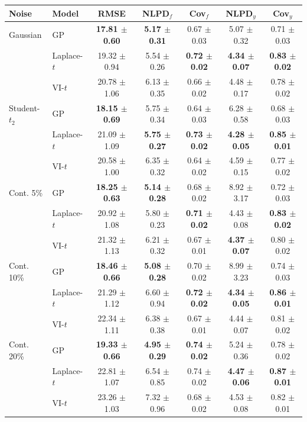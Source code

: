 \begin{tabular}{llccccc}
\toprule
Noise & Model & RMSE & NLPD$_f$ & Cov$_f$ & NLPD$_y$ & Cov$_y$ \\
\midrule
Gaussian & GP & \textbf{17.81 $\pm$ 0.60} & \textbf{5.17 $\pm$ 0.31} & 0.67 $\pm$ 0.03 & 5.07 $\pm$ 0.32 & 0.71 $\pm$ 0.03 \\
 & Laplace-$t$ & 19.32 $\pm$ 0.94 & 5.54 $\pm$ 0.26 & \textbf{0.72 $\pm$ 0.02} & \textbf{4.34 $\pm$ 0.07} & \textbf{0.83 $\pm$ 0.02} \\
 & VI-$t$ & 20.78 $\pm$ 1.06 & 6.13 $\pm$ 0.35 & 0.66 $\pm$ 0.02 & 4.48 $\pm$ 0.17 & 0.78 $\pm$ 0.02 \\
\midrule
Student-$t_2$ & GP & \textbf{18.15 $\pm$ 0.69} & 5.75 $\pm$ 0.34 & 0.64 $\pm$ 0.03 & 6.28 $\pm$ 0.58 & 0.68 $\pm$ 0.03 \\
 & Laplace-$t$ & 21.09 $\pm$ 1.09 & \textbf{5.75 $\pm$ 0.27} & \textbf{0.73 $\pm$ 0.02} & \textbf{4.28 $\pm$ 0.05} & \textbf{0.85 $\pm$ 0.01} \\
 & VI-$t$ & 20.58 $\pm$ 1.00 & 6.35 $\pm$ 0.32 & 0.64 $\pm$ 0.02 & 4.59 $\pm$ 0.15 & 0.77 $\pm$ 0.02 \\
\midrule
Cont. 5\% & GP & \textbf{18.25 $\pm$ 0.63} & \textbf{5.14 $\pm$ 0.28} & 0.68 $\pm$ 0.02 & 8.92 $\pm$ 3.17 & 0.72 $\pm$ 0.03 \\
 & Laplace-$t$ & 20.92 $\pm$ 1.08 & 5.80 $\pm$ 0.23 & \textbf{0.71 $\pm$ 0.02} & 4.43 $\pm$ 0.08 & \textbf{0.83 $\pm$ 0.02} \\
 & VI-$t$ & 21.32 $\pm$ 1.13 & 6.21 $\pm$ 0.32 & 0.67 $\pm$ 0.01 & \textbf{4.37 $\pm$ 0.07} & 0.80 $\pm$ 0.02 \\
\midrule
Cont. 10\% & GP & \textbf{18.46 $\pm$ 0.66} & \textbf{5.08 $\pm$ 0.28} & 0.70 $\pm$ 0.02 & 8.99 $\pm$ 3.23 & 0.74 $\pm$ 0.03 \\
 & Laplace-$t$ & 21.29 $\pm$ 1.12 & 6.60 $\pm$ 0.94 & \textbf{0.72 $\pm$ 0.02} & \textbf{4.34 $\pm$ 0.05} & \textbf{0.86 $\pm$ 0.01} \\
 & VI-$t$ & 22.34 $\pm$ 1.11 & 6.38 $\pm$ 0.38 & 0.67 $\pm$ 0.01 & 4.44 $\pm$ 0.07 & 0.81 $\pm$ 0.02 \\
\midrule
Cont. 20\% & GP & \textbf{19.33 $\pm$ 0.66} & \textbf{4.95 $\pm$ 0.29} & \textbf{0.74 $\pm$ 0.02} & 5.24 $\pm$ 0.36 & 0.78 $\pm$ 0.02 \\
 & Laplace-$t$ & 22.81 $\pm$ 1.07 & 6.54 $\pm$ 0.85 & 0.74 $\pm$ 0.02 & \textbf{4.47 $\pm$ 0.06} & \textbf{0.87 $\pm$ 0.01} \\
 & VI-$t$ & 23.26 $\pm$ 1.03 & 7.32 $\pm$ 0.96 & 0.68 $\pm$ 0.02 & 4.53 $\pm$ 0.08 & 0.82 $\pm$ 0.01 \\

\end{tabular}
